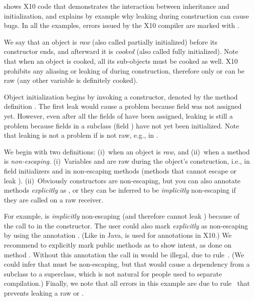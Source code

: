  shows X10 code that demonstrates the interaction
    between inheritance and initialization,
    and explains by example why leaking \this during construction can cause bugs.
In all the examples, errors issued by the X10 compiler are marked with .

We say that an object is \emph{raw} (also called partially initialized) before its constructor ends,
    and afterward it is \emph{cooked} (also called fully initialized).
Note that when an object is cooked, all its sub-objects must be cooked as well.
X10 prohibits any aliasing or leaking of \this during construction,
    therefore only \this or  can be raw (any other variable is definitely cooked).

Object initialization begins by invoking a constructor,
    denoted by the method definition .
The first leak would cause a problem because field  was not assigned yet.
However, even after all the fields of  have been assigned,
    leaking is still a problem
    because fields in a subclass (field ) have not yet been initialized.
Note that leaking is not a problem if \this is not raw, e.g., in .

We begin with two definitions:
    (i)~when an object is \emph{raw}, and
    (ii)~when a method is \emph{non-escaping}.
(i)~Variables \this and  are raw
    during the object's construction,
    i.e., in field initializers and in {non-escaping} methods
    (methods that cannot escape or leak \this).
(ii)~Obviously constructors are non-escaping,
    but you can also annotate methods \emph{explicitly} as ,
    or they can be inferred to be \emph{implicitly} non-escaping
    if they are called on a raw \this receiver.

For example,  is \emph{implicitly} non-escaping (and therefore cannot leak \this)
    because of the call to 
    in the constructor.
The user could also mark  \emph{explicitly} as non-escaping by using the annotation
    .
(Like in Java,  is used for annotations in X10.)
We recommend to explicitly mark public methods as  to show intent,
    as done on method .
Without this annotation the call  in  would be illegal,
    due to rule~.
(We could infer that  must be non-escaping,
    but that would cause a dependency from a subclass to a superclass,
    which is not natural for people used to separate compilation.)
Finally, we note that all errors in this example are due to rule~
    that prevents leaking a raw \this or .




